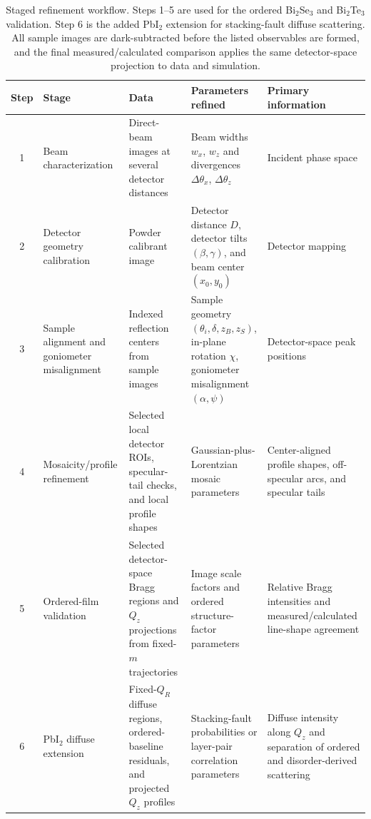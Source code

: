 \begin{table}[!ht]
  \centering
  \caption{Staged refinement workflow. Steps 1--5 are used for the ordered Bi$_2$Se$_3$ and Bi$_2$Te$_3$ validation. Step 6 is the added PbI$_2$ extension for stacking-fault diffuse scattering. All sample images are dark-subtracted before the listed observables are formed, and the final measured/calculated comparison applies the same detector-space projection to data and simulation.}
  \label{tab:refinement_workflow}
  \scriptsize
  \setlength{\tabcolsep}{3pt}
  \renewcommand{\arraystretch}{1.08}
  \begin{tabularx}{\linewidth}{@{}c >{\raggedright\arraybackslash}p{2.45cm} >{\raggedright\arraybackslash}X >{\raggedright\arraybackslash}X >{\raggedright\arraybackslash}p{2.75cm}@{}}
    \toprule
    Step & Stage & Data & Parameters refined & Primary information \\
    \midrule
    1 &
    Beam characterization &
    Direct-beam images at several detector distances &
    Beam widths $w_x$, $w_z$ and divergences $\Delta\theta_x$, $\Delta\theta_z$ &
    Incident phase space \\
    2 &
    Detector geometry calibration &
    Powder calibrant image &
    Detector distance $D$, detector tilts $(\beta,\gamma)$, and beam center $(x_0,y_0)$ &
    Detector mapping \\
    3 &
    Sample alignment and goniometer misalignment &
    Indexed reflection centers from sample images &
    Sample geometry $(\theta_i,\delta,z_B,z_S)$, in-plane rotation $\chi$, goniometer misalignment $(\alpha,\psi)$ &
    Detector-space peak positions \\
    4 &
    Mosaicity/profile refinement &
    Selected local detector ROIs, specular-tail checks, and local profile shapes &
    Gaussian-plus-Lorentzian mosaic parameters &
    Center-aligned profile shapes, off-specular arcs, and specular tails \\
    5 &
    Ordered-film validation &
    Selected detector-space Bragg regions and $Q_z$ projections from fixed-$m$ trajectories &
    Image scale factors and ordered structure-factor parameters &
    Relative Bragg intensities and measured/calculated line-shape agreement \\
    6 &
    PbI$_2$ diffuse extension &
    Fixed-$Q_R$ diffuse regions, ordered-baseline residuals, and projected $Q_z$ profiles &
    Stacking-fault probabilities or layer-pair correlation parameters &
    Diffuse intensity along $Q_z$ and separation of ordered and disorder-derived scattering \\
    \bottomrule
  \end{tabularx}
\end{table}

